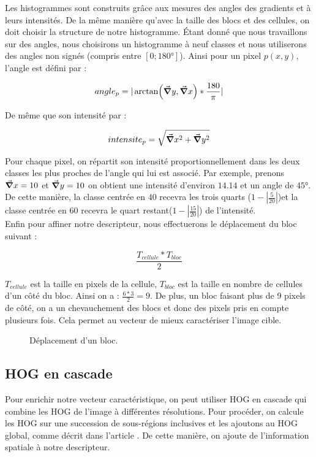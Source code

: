 Les histogrammes sont construits grâce aux mesures des angles des gradients et à leurs intensités. De la même manière qu'avec la taille des blocs et des cellules, on doit choisir la structure de notre histogramme. Étant donné que nous travaillons sur des angles, nous choisirons un histogramme à neuf classes et nous utiliserons des angles non signés (compris entre $[0; 180°]$).
Ainsi pour un pixel $p(x,y)$, l'angle est défini par :

\[ angle_{p} = |\arctan (\grad y, \grad x)*\frac{180}{\pi}| \]

De même que son intensité par :

\[ intensite_{p} = \sqrt{\grad x^{2} + \grad y^{2}} \]

Pour chaque pixel, on répartit son intensité proportionnellement dans les deux classes les plus proches de l'angle qui lui est associé. 
Par exemple, prenons $\grad x = 10$ et $\grad y = 10$ on obtient une intensité d'environ $14.14$ et un angle de $45°$. De cette manière, la classe centrée en $40$ recevra les trois quarts ($1 - |\frac{5}{20}|$)et la classe centrée en $60$ recevra le quart restant($1 - |\frac{15}{20}|$) de l'intensité.\\


Enfin pour affiner notre descripteur, nous effectuerons le déplacement du bloc suivant :

\[ \frac{T_{cellule} * T_{bloc}}{2} \]

$T_{cellule}$ est la taille en pixels de la cellule,
$T_{bloc}$ est la taille en nombre de cellules d'un côté du bloc.
Ainsi on a : $\frac{6*3}{2} = 9$. De plus, un bloc faisant plus de 9 pixels de côté, on a un chevauchement des blocs et donc des pixels pris en compte plusieurs fois. Cela permet au vecteur de mieux caractériser l'image cible.

\begin{figure}[!htbp]
\center
\caption{Déplacement d'un bloc.}
\label{fig:blocOverlap}
\end{figure}
\FloatBarrier

\subsection{HOG en cascade}

Pour enrichir notre vecteur caractéristique, on peut utiliser HOG en cascade qui combine les HOG de l'image à différentes résolutions. Pour procéder, on calcule les HOG sur une succession de sous-régions inclusives et les ajoutons au HOG global, comme décrit dans l'article \cite{qiang_zhu_fast_2006}. De cette manière, on ajoute de l'information spatiale à notre descripteur.

